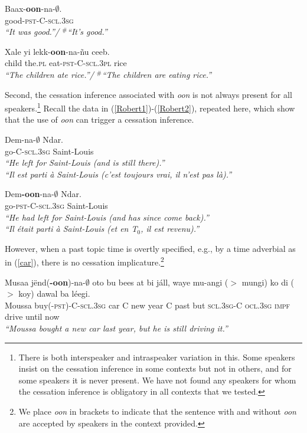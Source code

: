 \documentclass[output=paper
,modfonts
,nonflat]{langsci/langscibook}
\begin{document}
\ea
\gll Baax-\textbf{oon}-na-$\emptyset$.\\
good-\textsc{pst}-C-\textsc{scl.3sg}\\
\glt \textit{``It was good.''/ $^{\#}$``It's good.''}\label{good2}
\z

\ea
\gll Xale yi lekk-\textbf{oon}-na-\~nu ceeb.\\
child the.\textsc{pl} eat-\textsc{pst}-C-\textsc{scl.3pl} rice\\
\glt \textit{``The children ate rice.''/ $^{\#}$``The children are eating
  rice.''}\label{eat3}
\z

Second, the cessation inference associated with \textit{oon} is not
always present for all speakers.\footnote{There is both interspeaker
  and intraspeaker variation in this. Some speakers insist on the
  cessation inference in some contexts but not in others, and for some
  speakers it is never present. We have not found any speakers for
  whom the cessation inference is obligatory in all contexts that we tested.} Recall the data in (\ref{Robert1})-(\ref{Robert2}), repeated here, which show that the use of \textit{oon} can
trigger a cessation inference.

\ea
\gll\label{leave1-rep}Dem-na-$\emptyset$ Ndar.\\
go-C-\textsc{scl.3sg} Saint-Louis\\
\glt \textit{``He left for Saint-Louis (and is still there).''}\\\textit{``Il est parti \`a Saint-Louis (c'est toujours vrai, il n'est
  pas l\`a).''} \hfill \citep[p.~279]{robert91approche}
\z

\ea
\gll\label{leave2-rep}Dem\textbf{-oon}-na-$\emptyset$ Ndar.\\
go-\textsc{pst-C-scl.3sg} Saint-Louis\\
\glt \textit{``He had left for Saint-Louis (and has since come back).''}\\\textit{``Il \'etait parti \`a Saint-Louis (et en T$_0$,
  il est revenu).''} \hfill \citep[p.~279]{robert91approche}
\z

However, when a past topic time is overtly specified, e.g., by a time adverbial as in (\ref{car}), there is no cessation implicature.\footnote{We place \textit{oon} in brackets to indicate that the sentence with and without \textit{oon} are accepted by speakers in the context provided.}

\ea\label{car}
\gll Musaa j\"end(\textbf{-oon})-na-$\emptyset$ oto bu bees at bi j\'all, waye mu-{angi ($>$ mungi)} ko {di ($>$ koy)} dawal ba l\'eegi.\\
Moussa buy(-\textsc{pst})-C-\textsc{scl.3sg} car C new year C past but \textsc{scl.3sg}-C \textsc{ocl.3sg} \textsc{impf} drive until now\\
\glt \textit{``Moussa bought a new car last year, but he is still driving it.''} 
\z
\end{document}
